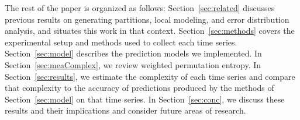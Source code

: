 

The rest of the paper is organized as follows:
Section~\ref{sec:related} discusses previous results on generating partitions, local modeling, and error distribution analysis, and situates this work in that
context. Section~\ref{sec:methods} covers the experimental setup and
methods used to collect each time series. Section~\ref{sec:model}
describes the prediction models we implemented.  In
Section~\ref{sec:meaComplex}, we review weighted permutation entropy.
In Section~\ref{sec:results}, we estimate the complexity of each time
series and compare that complexity to the accuracy of predictions
produced by the methods of Section~\ref{sec:model} on that time
series.  In Section~\ref{sec:conc}, we discuss these results and their
implications and consider future areas of research.

